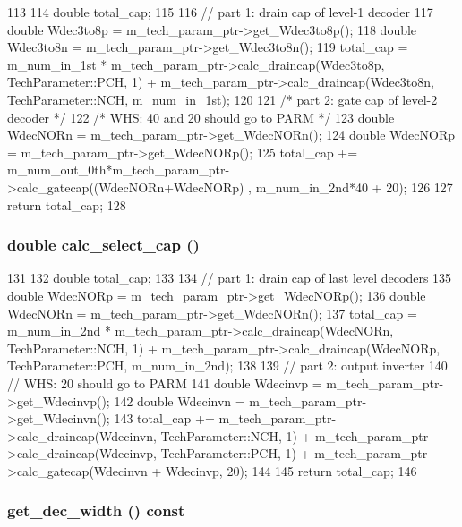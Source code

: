 \begin{DoxyCode}
113 {
114     double total_cap;
115 
116     // part 1: drain cap of level-1 decoder
117     double Wdec3to8p = m_tech_param_ptr->get_Wdec3to8p();
118     double Wdec3to8n = m_tech_param_ptr->get_Wdec3to8n();
119     total_cap = m_num_in_1st * m_tech_param_ptr->calc_draincap(Wdec3to8p, 
      TechParameter::PCH, 1) + m_tech_param_ptr->calc_draincap(Wdec3to8n, 
      TechParameter::NCH, m_num_in_1st);
120 
121     /* part 2: gate cap of level-2 decoder */
122     /* WHS: 40 and 20 should go to PARM */
123     double WdecNORn = m_tech_param_ptr->get_WdecNORn();
124     double WdecNORp = m_tech_param_ptr->get_WdecNORp();
125     total_cap += m_num_out_0th*m_tech_param_ptr->calc_gatecap((WdecNORn+WdecNORp)
      , m_num_in_2nd*40 + 20);
126 
127     return total_cap;
128 }
\end{DoxyCode}
\hypertarget{classDecoderUnit_a874bd4e177d9811be815cbf21521c785}{
\subsubsection[{calc\_\-select\_\-cap}]{\setlength{\rightskip}{0pt plus 5cm}double calc\_\-select\_\-cap ()}}
\label{classDecoderUnit_a874bd4e177d9811be815cbf21521c785}



\begin{DoxyCode}
131 {
132     double total_cap;
133 
134     // part 1: drain cap of last level decoders 
135     double WdecNORp = m_tech_param_ptr->get_WdecNORp();
136     double WdecNORn = m_tech_param_ptr->get_WdecNORn();
137     total_cap = m_num_in_2nd * m_tech_param_ptr->calc_draincap(WdecNORn, 
      TechParameter::NCH, 1) + m_tech_param_ptr->calc_draincap(WdecNORp, 
      TechParameter::PCH, m_num_in_2nd);
138 
139     // part 2: output inverter
140     // WHS: 20 should go to PARM
141     double Wdecinvp = m_tech_param_ptr->get_Wdecinvp();
142     double Wdecinvn = m_tech_param_ptr->get_Wdecinvn();
143     total_cap += m_tech_param_ptr->calc_draincap(Wdecinvn, TechParameter::NCH, 1)
       + m_tech_param_ptr->calc_draincap(Wdecinvp, TechParameter::PCH, 1) + 
      m_tech_param_ptr->calc_gatecap(Wdecinvn + Wdecinvp, 20);
144 
145     return total_cap;
146 }
\end{DoxyCode}
\hypertarget{classDecoderUnit_aac707404dfc7779123fb730a2f6141c9}{
\subsubsection[{get\_\-dec\_\-width}]{ get\_\-dec\_\-width () const}}
\label{classDecoderUnit_aac707404dfc7779123fb730a2f6141c9}




